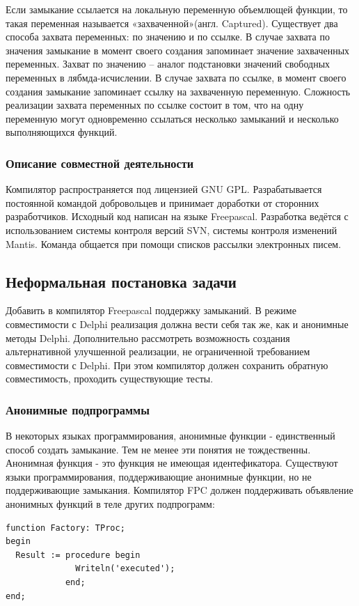 \documentclass{imcs}
\begin{document}
Если замыкание ссылается на локальную переменную объемлющей функции, то такая переменная 
называется «захваченной»(англ. Captured)\cite{anonymmethods}\cite{cpp}. Существует два
способа захвата переменных: по значению и по ссылке. В случае захвата по значения
замыкание в момент своего создания запоминает значение захваченных переменных.
Захват по значению -- аналог подстановки значений свободных переменных в лябмда-исчислении.
В случае захвата по ссылке, в момент своего создания замыкание запоминает ссылку 
на захваченную переменную. Сложность реализации захвата переменных по ссылке состоит в том,
что на одну переменную могут одновременно ссылаться несколько замыканий и несколько
выполняющихся функций.

\subsubsection{Описание совместной деятельности}

Компилятор распространяется под лицензией GNU GPL\cite{gpl}. Разрабатывается
постоянной командой добровольцев и принимает доработки от сторонних разработчиков.
Исходный код написан на языке Freepascal. Разработка ведётся с использованием системы
контроля версий SVN\cite{subversion}, системы контроля изменений Mantis\cite{mantis}.
Команда общается при помощи списков рассылки электронных писем.

\subsection{Неформальная постановка задачи}

Добавить в компилятор Freepascal поддержку замыканий. В режиме совместимости с 
Delphi реализация должна вести себя так же, как и анонимные методы
Delphi. Дополнительно рассмотреть возможность создания альтернативной улучшенной
реализации, не ограниченной требованием совместимости с Delphi.
При этом компилятор должен сохранить обратную совместимость, проходить существующие тесты. 

\subsubsection{Анонимные подпрограммы}

В некоторых языках программирования, анонимные функции - единственный
способ создать замыкание. Тем не менее эти понятия не тождественны.
Анонимная функция - это функция не имеющая идентефикатора. Существуют
языки программирования, поддерживающие анонимные функции, но не
поддерживающие замыкания. Компилятор FPC должен поддерживать
объявление анонимных функций в теле других подпрограмм:
\begin{lstlisting}
function Factory: TProc;
begin
  Result := procedure begin
              Writeln('executed');
            end;
end;
\end{lstlisting}
\end{document}
